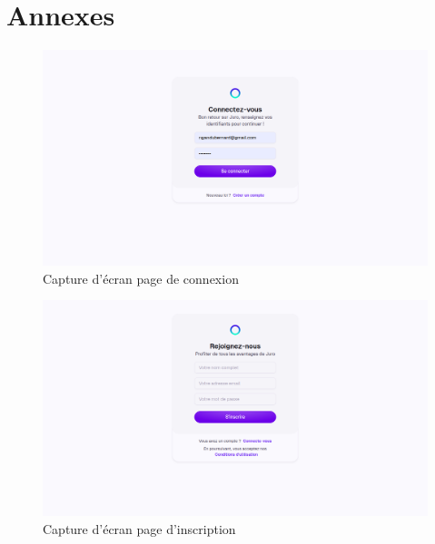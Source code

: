 \thispagestyle{empty}


\vspace*{3cm}

\chapter*{Annexes}
\label{appendix} 


\begin{figure}[H]
    \centering
    \includegraphics[width=15cm]{Images/screenshot-juro-1.png}
    \caption{Capture d'écran page de connexion}
    \label{fig:app-screenshot-1}
\end{figure}

\begin{figure}[H]
    \centering
    \includegraphics[width=15cm]{Images/screenshot-juro-2.png}
    \caption{Capture d'écran page d'inscription}
    \label{fig:app-screenshot-1}
\end{figure}

